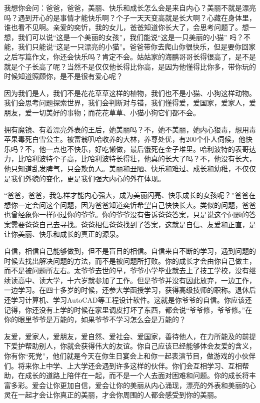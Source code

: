我想你会问：爸爸，爸爸，美丽、快乐和成长怎么会是来自内心？美丽不就是漂亮吗？遇到开心的是事情才能快乐啊？个子一天天变高就是长大啊？心藏在身体里，谁也看不见啊。亲爱的奕忻，我的女儿，爸爸知道你长大了，会思考问题了。想一想，我们可以说“这是一个美丽的女孩”，我们能说“这是一只美丽的小猫” 吗？不能，我们只能说“这是一只漂亮的小猫”。爸爸带你去爬山你很快乐，但是要你回家之后写篇作文，你还会快乐吗？肯定不会。姑姑家的海鹏哥哥长得很高了，是不是就是个子长高了呢？当然不是仅仅他长得比你高，是因为他懂得比你多，带你玩的时候知道照顾你，是不是很有爱心呢？

因为我们是人，我们不是花花草草这样的植物，我们也不是小猫、小狗这样动物。我们会思考问题探索世界，我们会判断对与错，我们懂得爱，爱国家，爱家人，爱朋友，爱一切美好的事物；而花花草草、小猫小狗它们都不会。

拥有魔镜、有着漂亮外表的王后，她美丽吗？不，她不美丽，她内心狠毒，想用毒苹果毒死白雪公主。被富翁叭哈收养的大林，养尊处优，有200个仆人伺候，他快乐吗？不，他一点也不快乐，好吃懒做，最后饿死在金子堆里。哈利波特的表哥达力，比哈利波特个子高，比哈利波特长得壮，他真的长大了吗？不，他没有长大，他只知道乱发脾气，只会欺负人。美丽和丑陋、快乐和难过、成长和幼稚，不仅仅是我们外貌的变化，更是我们强大内心的外在体现。

“爸爸，爸爸，我怎样才能内心强大，成为美丽闪亮、快乐成长的女孩呢？”爸爸在想你一定会问这个问题，因为爸爸知道奕忻希望自己快快长大。类似的问题，爸爸也曾经象你一样问过你的爷爷。你的爷爷没有告诉爸爸答案，只是说这个问题的答案需要爸爸自己去寻找。爸爸相信爸爸找到了答案，这就是自信、友爱和正直，是让你美丽、快乐和成长的真正的源泉。

自信，相信自己能够做到，但不是盲目的相信。自信来自不断的学习，遇到问题的时候去找出解决问题的方法，而不是被问题所打败。你的成长才会由你自己做主，而不是被问题所左右。太爷爷去世的早，爷爷小学毕业就去上了技工学校，没有继续读高中、读大学，十六岁就参加了工作。但是爷爷并没有因此放弃，一边工作，一边学习。在四十多岁的时候，还参大学函授学习，获得高级技师的职称。退休后还学习计算机、学习AutoCAD等工程设计软件。这就是你爷爷的自信。你应该还记得，你还没有上学的时候在家里调皮打坏了东西，都会说“爷爷修，爷爷修。”在你的眼里爷爷是万能的，如果爷爷不学习怎么会是万能的？

友爱，爱家人，爱朋友，爱自然、爱社会、爱国家，善待他人，在力所能及的前提下爱护帮助别人，你就会获得伟大的友谊。你自己应该已经能够体会友爱的含义，你有你“死党”，他们就是今天在你生日宴会上和你一起表演节目，做游戏的小伙伴们。将来你上中学、上大学还会遇到许多这样的伙伴。你们会互相学习、互相帮助，在成长的道路上陪伴在一起，而不是一个人去面对困难和问题。你的成长将丰富多彩。爱会让你更加自信，爱会让你的美丽从内心涌现，漂亮的外表和美丽的心灵在一起才会让你真正的美丽，才会你周围的人都会感受到你的美丽。

